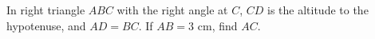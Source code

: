 In right triangle $ABC$ with the right angle at $C$, $CD$ is the altitude to the hypotenuse, and $AD=BC$. If $AB=3$ cm, find $AC$.
